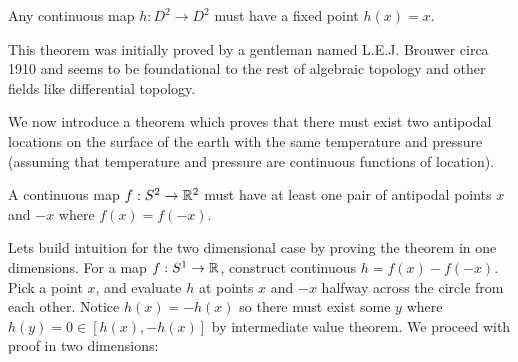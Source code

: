 \documentclass[10pt]{article}
\begin{document}
\begin{theorem}
	Any continuous map $h: D^2 \to D^2$ must have a fixed point $h(x) = x$.
\end{theorem}

This theorem was initially proved by a gentleman named L.E.J. Brouwer circa 1910 and seems to be foundational to the rest of algebraic topology and other fields like differential topology.

We now introduce a theorem which proves that there must exist two antipodal
locations on the surface of the earth with the same temperature and pressure
(assuming that temperature and pressure are continuous functions of location).

\begin{theorem}
	A continuous map $f: S^2 \to \mathbb{R}^2$ must have at least one pair of antipodal points $x$ and $-x$ where $f(x) = f(-x)$.
\end{theorem}

Lets build intuition for the two dimensional case by proving the theorem in one
dimensions. For a map $f: S^1 \to \mathbb{R}$, construct continuous $h = f(x) - f(-x)$.
Pick a point $x$, and evaluate $h$ at points $x$ and $-x$ halfway across the
circle from each other. Notice $h(x) = -h(x)$ so there must exist some $y$
where $h(y) = 0 \in [h(x), -h(x)]$ by intermediate value theorem. We proceed
with proof in two dimensions:
\end{document}
